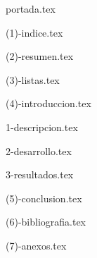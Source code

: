 \documentclass[12pt, letterpaper, table, xcdraw]{inf-pucv}
\begin{document}
  {portada.tex}
  \clearpage

  {(1)-indice.tex}
  \clearpage
  
  {(2)-resumen.tex}
  \clearpage

  {(3)-listas.tex}
  \clearpage
  
  {(4)-introduccion.tex}
  \clearpage

  {1-descripcion.tex}
  \clearpage

  {2-desarrollo.tex}
  \clearpage

  {3-resultados.tex}
  \clearpage

  {(5)-conclusion.tex}
  \clearpage
  
  {(6)-bibliografia.tex}
  \clearpage
  
  {(7)-anexos.tex}
  \clearpage
\end{document}

